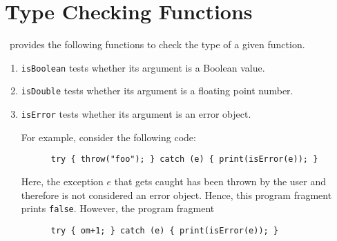 \section{Type Checking Functions}
\setlx\ provides the following functions to check the type of a given function.
\begin{enumerate}
\item \texttt{isBoolean} tests whether its argument is a Boolean value.
\item \texttt{isDouble} tests whether its argument is a floating point number. 
\item \texttt{isError} tests whether its argument is an error object.

      For example, consider the following code:
      \begin{verbatim}
      try { throw("foo"); } catch (e) { print(isError(e)); }
      \end{verbatim}
      \vspace*{-0.5cm}

      Here, the exception $e$ that gets caught has been thrown by the user and therefore
      is not considered an error object.  Hence, this program fragment prints \texttt{false}.
      However, the program fragment
      \begin{verbatim}
      try { om+1; } catch (e) { print(isError(e)); }
      \end{verbatim}
      \vspace*{-0.5cm}


\end{enumerate}
